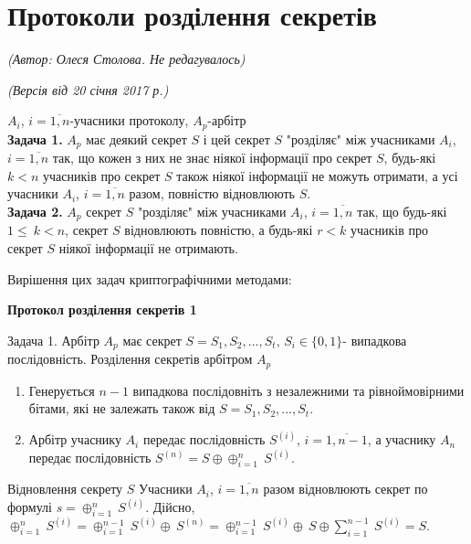 
%
\section{Протоколи розділення секретів}
\begin{flushright}
\emph{(Автор: Олеся Столова. Не редагувалось)}
\par \emph{(Версія від 20 січня 2017 р.)}
\end{flushright}

$A_i$, $i=\overline{1,n}$-учасники протоколу, $A_p$-арбітр
\\
\textbf{Задача 1. }$A_p$ має деякий секрет $S$  і цей секрет $S$ "розділяє" між учасниками $A_i$, $i=\overline{1,n}$ так, що кожен з них не знає ніякої інформації про секрет $S$, будь-які $k<n$ учасників про секрет $S$ також ніякої інформації не можуть отримати, а усі учасники $A_i$, $i=\overline{1,n}$ разом, повністю відновлюють $S$.
\\
\textbf{Задача 2.} $A_p$ секрет $S$ "розділяє" між учасниками $A_i$, $i=\overline{1,n}$ так, що будь-які $1\leq\ k<n$, секрет $S$ відновлюють повністю, а будь-які $r<k$ учасників про секрет $S$ ніякої інформації не отримають.

Вирішення цих задач криптографічними методами:
\begin{center}
\textbf{Протокол розділення секретів 1}
\end{center}
Задача 1. Арбітр $A_p$ має секрет $S=S_1,S_2,\ldots,S_t$, $S_i\in{\{0,1}\}$- випадкова послідовність.
Розділення секретів арбітром $A_p$
\begin{enumerate}
\item Генерується $n-1$ випадкова послідовніть з незалежними та рівноймовірними бітами, які не залежать також від $S=S_1,S_2,\ldots,S_t$.
\item Арбітр учаснику $A_i$ передає послідовність $S^{(i)}$, $i=\overline{1,n-1}$, а учаснику $A_n$ передає послідовність $S^{(n)}=S\oplus\oplus_{i=1}^n\ S^{(i)}$.
\end{enumerate}
Відновлення секрету $S$
Учасники $A_i$, $i=\overline{1,n}$ разом відновлюють секрет по формулі 
$s=\oplus_{i=1}^n\ S^{(i)}$.
Дійсно, $\oplus_{i=1}^n\ S^{(i)} =\oplus_{i=1}^{n-1}\ S^{(i)}\oplus\ S^{(n)}=\oplus_{i=1}^{n-1}\ S^{(i)}\oplus\ S\oplus\sum\limits_{i=1}^{n-1}\ S^{(i)}=S$.

